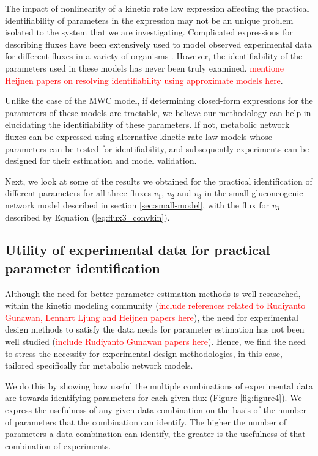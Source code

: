 \documentclass[10pt]{article}
\begin{document}
	The impact of nonlinearity of a kinetic rate law expression affecting the practical identifiability of parameters in the expression may not be an unique problem isolated to the system that we are investigating. Complicated expressions for describing fluxes have been extensively used to model observed experimental data for different fluxes in a variety of organisms \parencite{Chassagnole2002a, Peskov2012, VanHeerden2014}. However, the identifiability of the parameters used in these models has never been truly examined. \textcolor{red}{mentione Heijnen papers on resolving identifiability using approximate models here}.
	
	Unlike the case of the MWC model, if determining closed-form expressions for the parameters of these models are tractable, we believe our methodology can help in elucidating the identifiability of these parameters. If not, metabolic network fluxes can be expressed using alternative kinetic rate law models whose parameters can be tested for identifiability, and subsequently experiments can be designed for their estimation and model validation.
	
	Next, we look at some of the results we obtained for the practical identification of different parameters for all three fluxes $v_1$, $v_2$ and $v_3$ in the small gluconeogenic network model described in section \ref{sec:small-model}, with the flux for $v_3$ described by Equation (\ref{eq:flux3_convkin}). 	
	
	\subsection{Utility of experimental data for practical parameter identification}\label{sec:data_utility}
	Although the need for better parameter estimation methods is well researched, within the kinetic modeling community (\textcolor{red}{include references related to Rudiyanto Gunawan, Lennart Ljung and Heijnen papers here}), the need for experimental design methods to satisfy the data needs for parameter estimation has not been well studied (\textcolor{red}{include Rudiyanto Gunawan papers here}). Hence, we find the need to stress the necessity for experimental design methodologies, in this case, tailored specifically for metabolic network models. 	
	
	We do this by showing how useful the multiple combinations of experimental data are towards identifying parameters for each given flux (Figure \ref{fig:figure4}). We express the usefulness of any given data combination on the basis of the number of parameters that the combination can identify. The higher the number of parameters a data combination can identify, the greater is the usefulness of that combination of experiments. 
	
\end{document}
